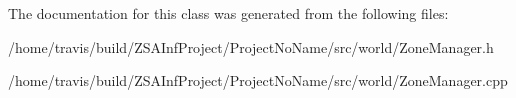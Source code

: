 The documentation for this class was generated from the following files\-:\begin{DoxyCompactItemize}
\item 
/home/travis/build/\-Z\-S\-A\-Inf\-Project/\-Project\-No\-Name/src/world/Zone\-Manager.\-h\item 
/home/travis/build/\-Z\-S\-A\-Inf\-Project/\-Project\-No\-Name/src/world/Zone\-Manager.\-cpp\end{DoxyCompactItemize}
